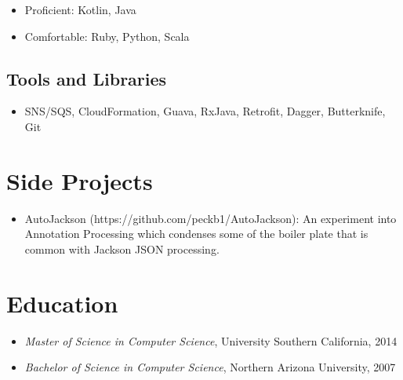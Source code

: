 \documentclass[11pt]{article}
\begin{document}
\begin{itemize}
\item Proficient: Kotlin, Java
\item Comfortable: Ruby, Python, Scala
\end{itemize}
\subsection*{Tools and Libraries}
\label{sec-2-2}

\begin{itemize}
\item SNS/SQS, CloudFormation, Guava, RxJava, Retrofit, Dagger, Butterknife, Git
\end{itemize}
\section*{Side Projects}
\begin{itemize}
\item AutoJackson (https://github.com/peckb1/AutoJackson): An experiment into Annotation Processing which condenses some of the boiler plate that is common with Jackson JSON processing. 
\end{itemize}



\section*{Education}
\label{sec-4}

\begin{itemize}
\item \emph{Master of Science in Computer Science}, University Southern California, 2014
\item \emph{Bachelor of Science in Computer Science}, Northern Arizona University, 2007
\end{itemize}
\end{document}
